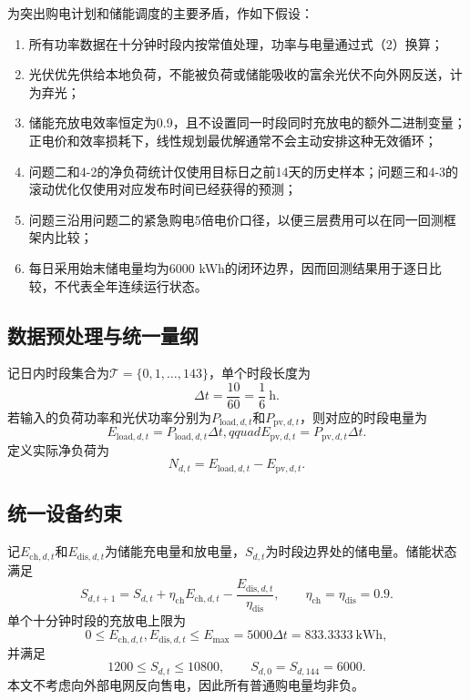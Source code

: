 \documentclass{cumcmthesis}
\newcommand{\kwh}{\mathrm{kWh}}
\newcommand{\Tset}{\mathcal{T}}
\begin{document}
为突出购电计划和储能调度的主要矛盾，作如下假设：
\begin{enumerate}
    \item 所有功率数据在十分钟时段内按常值处理，功率与电量通过式（2）换算；
    \item 光伏优先供给本地负荷，不能被负荷或储能吸收的富余光伏不向外网反送，计为弃光；
    \item 储能充放电效率恒定为0.9，且不设置同一时段同时充放电的额外二进制变量；正电价和效率损耗下，线性规划最优解通常不会主动安排这种无效循环；
    \item 问题二和4-2的净负荷统计仅使用目标日之前14天的历史样本；问题三和4-3的滚动优化仅使用对应发布时间已经获得的预测；
    \item 问题三沿用问题二的紧急购电5倍电价口径，以便三层费用可以在同一回测框架内比较；
    \item 每日采用始末储电量均为6000 kWh的闭环边界，因而回测结果用于逐日比较，不代表全年连续运行状态。
\end{enumerate}

\subsection{数据预处理与统一量纲}

记日内时段集合为$\Tset=\{0,1,\ldots,143\}$，单个时段长度为
\begin{equation}
    \Delta t=\frac{10}{60}=\frac{1}{6}\ \mathrm{h}.
    \tag{1}
\end{equation}
若输入的负荷功率和光伏功率分别为$P_{\mathrm{load},d,t}$和$P_{\mathrm{pv},d,t}$，则对应的时段电量为
\begin{equation}
    E_{\mathrm{load},d,t}=P_{\mathrm{load},d,t}\Delta t,qquad
    E_{\mathrm{pv},d,t}=P_{\mathrm{pv},d,t}\Delta t.
    \tag{2}
\end{equation}
定义实际净负荷为
\begin{equation}
    N_{d,t}=E_{\mathrm{load},d,t}-E_{\mathrm{pv},d,t}.
    \tag{3}
\end{equation}

\subsection{统一设备约束}

记$E_{\mathrm{ch},d,t}$和$E_{\mathrm{dis},d,t}$为储能充电量和放电量，$S_{d,t}$为时段边界处的储电量。储能状态满足
\begin{equation}
S_{d,t+1}=S_{d,t}+\eta_{\mathrm{ch}}E_{\mathrm{ch},d,t}
-\frac{E_{\mathrm{dis},d,t}}{\eta_{\mathrm{dis}}},
\qquad \eta_{\mathrm{ch}}=\eta_{\mathrm{dis}}=0.9.
\tag{4}
\end{equation}
单个十分钟时段的充放电上限为
\begin{equation}
0\leq E_{\mathrm{ch},d,t},E_{\mathrm{dis},d,t}
\leq E_{\max}=5000\Delta t=833.3333\ \kwh,
\tag{5}
\end{equation}
并满足
\begin{equation}
1200\leq S_{d,t}\leq10800,\qquad S_{d,0}=S_{d,144}=6000.
\tag{6}
\end{equation}
本文不考虑向外部电网反向售电，因此所有普通购电量均非负。
\end{document}
